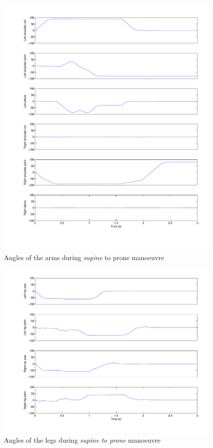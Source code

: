 \begin{figure}[htp]
\center
    \includegraphics[width = \textwidth]{figures/sup2proneArms}
    \caption[Angles of the arms during \emph{supine} to prone manoeuvre]{Angles of the arms during \emph{supine} to prone manoeuvre}
    \label{fig:sup2proneArms}
\end{figure}

\begin{figure}[htp]
\center
    \includegraphics[width = \textwidth]{figures/sup2proneLegs}
    \caption[Angles of the legs during \emph{supine to prone} manoeuvre]{Angles of the legs during \emph{supine to prone} manoeuvre}
    \label{fig:sup2proneLegs}
\end{figure}

